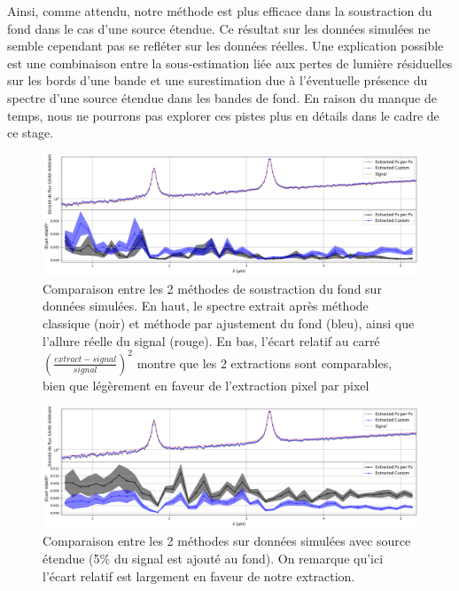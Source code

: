 \documentclass[12pt, a4paper]{article}
\begin{document}
Ainsi, comme attendu, notre méthode est plus efficace dans la soustraction du fond dans le cas d'une source étendue. Ce résultat sur les données simulées ne semble cependant pas se refléter sur les données réelles. Une explication possible est une combinaison entre la sous-estimation liée aux pertes de lumière résiduelles sur les bords d'une bande et une surestimation due à l'éventuelle présence du spectre d'une source étendue dans les bandes de fond. En raison du manque de temps, nous ne pourrons pas explorer ces pistes plus en détails dans le cadre de ce stage.

\begin{figure}[H]
  \centering
  \includegraphics[scale=0.4]{assets/comparaison_simulated.png}
  \caption{Comparaison entre les 2 méthodes de soustraction du fond sur données simulées. En haut, le spectre extrait après méthode classique (noir) et méthode par ajustement du fond (bleu), ainsi que l'allure réelle du signal (rouge). En bas, l'écart relatif au carré $(\frac{extract - signal}{signal})^2$ montre que les 2 extractions sont comparables, bien que légèrement en faveur de l'extraction pixel par pixel}
  \label{fig:comparaison_simulated}
\end{figure}

\begin{figure}[H]
  \centering
  \includegraphics[scale=0.4]{assets/comparaison_simulated_extended.png}
  \caption{Comparaison entre les 2 méthodes sur données simulées avec source étendue (5\% du signal est ajouté au fond). On remarque qu'ici l'écart relatif est largement en faveur de notre extraction.}
  \label{fig:comparaison_simulated_extended}
\end{figure}
\end{document}
